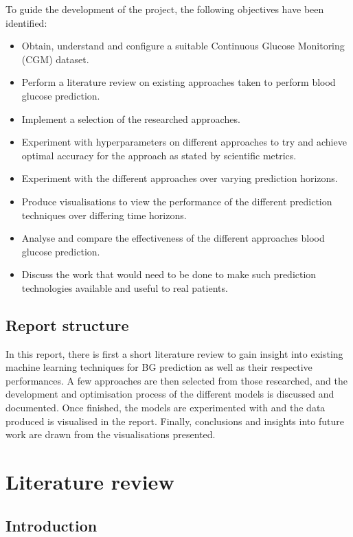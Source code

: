     To guide the development of the project, the following objectives have been identified: 
    \begin{itemize}
        \item Obtain, understand and configure a suitable Continuous Glucose Monitoring (CGM) dataset.
        \item Perform a literature review on existing approaches taken to perform blood glucose prediction.
        \item Implement a selection of the researched approaches.
        \item Experiment with hyperparameters on different approaches to try and achieve optimal accuracy for the approach as stated by scientific metrics.
        \item Experiment with the different approaches over varying prediction horizons.
        \item Produce visualisations to view the performance of the different prediction techniques over differing time horizons.
        \item Analyse and compare the effectiveness of the different approaches blood glucose prediction.
        \item Discuss the work that would need to be done to make such prediction technologies available and useful to real patients.
    \end{itemize}
    
  \subsection{Report structure}
    In this report, there is first a short literature review to gain insight into existing machine learning techniques for BG prediction as well as their respective performances. A few approaches are then selected from those researched, and the development and optimisation process of the different models is discussed and documented. Once finished, the models are experimented with and the data produced is visualised in the report. Finally, conclusions and insights into future work are drawn from the visualisations presented.
    
\section{Literature review} %
    \subsection{Introduction}

